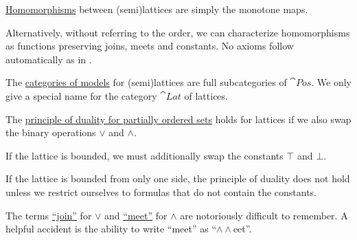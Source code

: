 \begin{definition}
\begin{thmenum}[resume=def:semilattice]
     \hyperref[def:first_order_homomorphism]{Homomorphisms} between (semi)lattices are simply the monotone maps.

    Alternatively, without referring to the order, we can characterize homomorphisms as functions preserving joins, meets and constants. No axioms follow automatically as in .

     The \hyperref[def:category_of_small_first_order_models]{categories of models} for (semi)lattices are full subcategories of \hyperref[def:partially_ordered_set/category]{\( \cat{Pos} \)}. We only give a special name for the category \( \cat{Lat} \) of lattices.

     The \hyperref[def:partially_ordered_set/duality]{principle of duality for partially ordered sets} holds for lattices if we also swap the binary operations \( \vee \) and \( \wedge \).

    If the lattice is bounded, we must additionally swap the constants \( \top \) and \( \bot \).

    If the lattice is bounded from only one side, the principle of duality does not hold unless we restrict ourselves to formulas that do not contain the constants.
  \end{thmenum}
\end{definition}

\begin{remark}\label{rem:lattice_operation_etymology}
  The terms \hyperref[def:semilattice/join]{\enquote{join}} for \( \vee \) and \hyperref[def:semilattice/meet]{\enquote{meet}} for \( \wedge \) are notoriously difficult to remember. A helpful accident is the ability to write \enquote{meet} as \enquote{\( \wedge \wedge \)eet}.
\end{remark}


